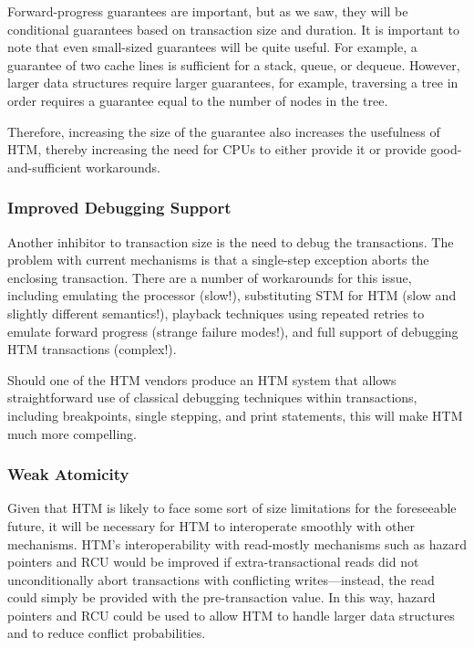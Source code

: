 Forward-progress guarantees are important, but as we saw, they will
be conditional guarantees based on transaction size and duration.
It is important to note that even small-sized guarantees will be
quite useful.
For example,
a guarantee of two cache lines is sufficient for a stack, queue, or dequeue.
However, larger data structures require larger guarantees, for example,
traversing a tree in order requires a guarantee equal to the number
of nodes in the tree.

Therefore, increasing the size of the guarantee also increases the
usefulness of HTM, thereby increasing the need for CPUs to either
provide it or provide good-and-sufficient workarounds.

\subsubsection{Improved Debugging Support}
\label{sec:future:Improved Debugging Support}

Another inhibitor to transaction size is the need to debug the transactions.
The problem with current mechanisms is that a single-step exception
aborts the enclosing transaction.
There are a number of workarounds for this issue, including emulating
the processor (slow!), substituting STM for HTM (slow and slightly
different semantics!),
playback techniques using repeated retries to emulate forward
progress (strange failure modes!), and
full support of debugging HTM transactions (complex!).

Should one of the HTM vendors produce an HTM system that allows
straightforward use of classical debugging techniques within
transactions, including breakpoints, single stepping, and
print statements, this will make HTM much more compelling.

\subsubsection{Weak Atomicity}
\label{sec:future:Weak Atomicity}

Given that HTM is likely to face some sort of size limitations for the
foreseeable future, it will be necessary for HTM to interoperate
smoothly with other mechanisms.
HTM's interoperability with read-mostly mechanisms such as hazard pointers
and RCU would be improved if extra-transactional reads did not
unconditionally abort transactions with conflicting writes---instead,
the read could simply be provided with the pre-transaction value.
In this way, hazard pointers and RCU could be used to allow HTM to handle
larger data structures and to reduce conflict probabilities.

